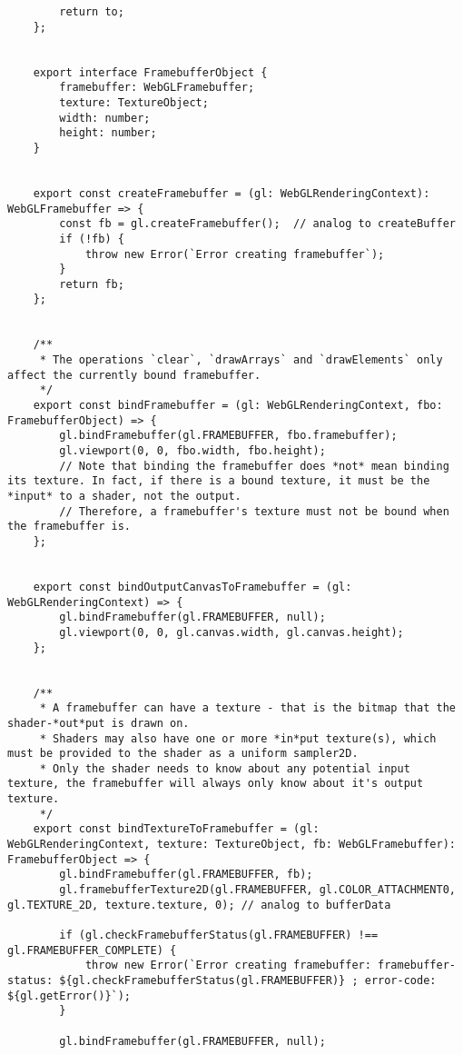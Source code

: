 {\begin{lstlisting}
        return to;
    };
    
    
    export interface FramebufferObject {
        framebuffer: WebGLFramebuffer;
        texture: TextureObject;
        width: number;
        height: number;
    }
    
    
    export const createFramebuffer = (gl: WebGLRenderingContext): WebGLFramebuffer => {
        const fb = gl.createFramebuffer();  // analog to createBuffer
        if (!fb) {
            throw new Error(`Error creating framebuffer`);
        }
        return fb;
    };
    
    
    /**
     * The operations `clear`, `drawArrays` and `drawElements` only affect the currently bound framebuffer.
     */
    export const bindFramebuffer = (gl: WebGLRenderingContext, fbo: FramebufferObject) => {
        gl.bindFramebuffer(gl.FRAMEBUFFER, fbo.framebuffer);
        gl.viewport(0, 0, fbo.width, fbo.height);
        // Note that binding the framebuffer does *not* mean binding its texture. In fact, if there is a bound texture, it must be the *input* to a shader, not the output.
        // Therefore, a framebuffer's texture must not be bound when the framebuffer is.
    };
    
    
    export const bindOutputCanvasToFramebuffer = (gl: WebGLRenderingContext) => {
        gl.bindFramebuffer(gl.FRAMEBUFFER, null);
        gl.viewport(0, 0, gl.canvas.width, gl.canvas.height);
    };
    
    
    /**
     * A framebuffer can have a texture - that is the bitmap that the shader-*out*put is drawn on.
     * Shaders may also have one or more *in*put texture(s), which must be provided to the shader as a uniform sampler2D.
     * Only the shader needs to know about any potential input texture, the framebuffer will always only know about it's output texture.
     */
    export const bindTextureToFramebuffer = (gl: WebGLRenderingContext, texture: TextureObject, fb: WebGLFramebuffer): FramebufferObject => {
        gl.bindFramebuffer(gl.FRAMEBUFFER, fb);
        gl.framebufferTexture2D(gl.FRAMEBUFFER, gl.COLOR_ATTACHMENT0, gl.TEXTURE_2D, texture.texture, 0); // analog to bufferData
    
        if (gl.checkFramebufferStatus(gl.FRAMEBUFFER) !== gl.FRAMEBUFFER_COMPLETE) {
            throw new Error(`Error creating framebuffer: framebuffer-status: ${gl.checkFramebufferStatus(gl.FRAMEBUFFER)} ; error-code: ${gl.getError()}`);
        }
    
        gl.bindFramebuffer(gl.FRAMEBUFFER, null);
    

\end{lstlisting}}
